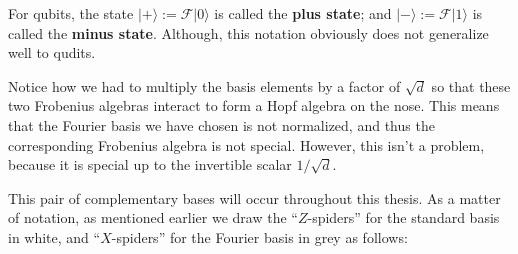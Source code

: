 For qubits, the  state $|+\rangle:=\mathcal{F}|0\rangle$ is called the {\bf plus state}; and  $|-\rangle:=\mathcal{F}|1\rangle$ is called the {\bf minus state}.  Although, this notation obviously does not generalize well to qudits.

Notice how we had to multiply the basis elements by a factor of $\sqrt d$ so that these two Frobenius algebras interact to form a Hopf algebra on the nose.  This means that the Fourier basis we have chosen is not normalized, and thus the corresponding Frobenius algebra is not special.  However, this isn't a problem, because it is special up to the invertible  scalar $1/\sqrt{d}$.

This pair of complementary bases will occur throughout this thesis.  As a matter of notation, as mentioned earlier we draw the ``$Z$-spiders'' for the standard basis in white,
and ``$X$-spiders'' for the Fourier basis in  grey as follows:

